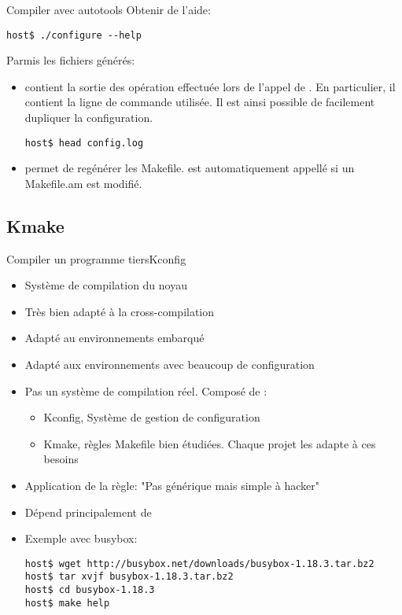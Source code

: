 \begin{frame}[fragile=singleslide]{Compiler avec autotools}
  Obtenir de l'aide:
\begin{lstlisting}
host$ ./configure --help
\end{lstlisting} %

  Parmis les fichiers générés:
  \begin{itemize}
  \item {}  contient la sortie  des opération effectuée
    lors de l'appel de .  En particulier, il contient
    la ligne de commande utilisée. Il est ainsi possible de facilement
    dupliquer la configuration.
\begin{lstlisting}
host$ head config.log
\end{lstlisting} %
  \item     {}     permet     de    regénérer     les
    Makefile.   est  automatiquement appellé  si un
    Makefile.am est modifié.
  \end{itemize}
\end{frame}


\subsection{Kmake}

\begin{frame}[fragile=singleslide]{Compiler un programme tiers}{Kconfig}
  \begin{itemize}
  \item Système de compilation du noyau
  \item Très bien adapté à la cross-compilation
  \item Adapté au environnements embarqué
  \item Adapté aux environnements avec beaucoup de configuration
  \item  Pas un  système de  compilation réel. Composé de :
    \begin{itemize}
    \item Kconfig, Système de gestion de configuration
    \item  Kmake, règles  Makefile  bien étudiées.  Chaque projet  les
      adapte à ces besoins
    \end{itemize}
  \item Application de la règle: "Pas générique mais simple à hacker"
  \item Dépend principalement de 
  \item Exemple avec busybox:
    \begin{lstlisting}
host$ wget http://busybox.net/downloads/busybox-1.18.3.tar.bz2
host$ tar xvjf busybox-1.18.3.tar.bz2
host$ cd busybox-1.18.3
host$ make help
    \end{lstlisting} %
  \end{itemize}
\end{frame}

